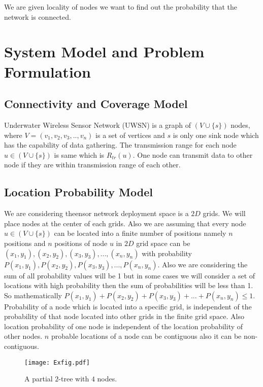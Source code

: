 \documentclass[12pt]{article}
\begin{document}
 We are given locality of nodes we want to find out the probability that the network is connected. 

\section{System Model and Problem Formulation}
\label{sec:systemmodel}
\subsection{Connectivity and Coverage Model}
\label{subsec:conAndCoverage}
Underwater Wireless Sensor Network (UWSN) is a graph of \((V\cup\{s\})\) nodes, where \(V=(v_1,v_2,v_3,..,v_n)\) is a set of vertices and \(s\) is only one sink node which has the capability of data gathering. The transmission range for each node \(u\in (V\cup\{s\})\)  is same which is \(R_{tr}(u)\). One node can transmit data to other node if they are within transmission range of each other.

\subsection{Location Probability Model}
\label{subsec:LPM}
We are considering theensor network deployment space is a \(2D\) grids. We will place nodes at the center of each grids. Also we are assuming that every node \(u\in (V\cup\{s\})\) can be located into a finite number of positions namely \(n\) positions and \(n\) positions of node \(u\) in \(2D\) grid space can be \((x_1,y_1),(x_2,y_2),(x_3,y_3),...,(x_n,y_n)\)  with probability \(P(x_1,y_1),P(x_2,y_2),P(x_3,y_3),...,P(x_n,y_n)\). Also we are considering the sum of all probability values will be 1 but in some cases we will consider a set of locations with high probability then the sum of probabilities will be less than 1. So mathematically  \(P(x_1,y_1)+P(x_2,y_2)+P(x_3,y_3)+...+P(x_n,y_n)\leq 1\). Probability of a node which is located into a specific grid, is independent of the probability of that node located into other grids in the finite grid space. Also location probability of one node is independent of the location probability of other nodes. \(n\) probable locations of a node can be contiguous also it can be non-contiguous.
\begin{figure}
\texttt{[image: Exfig.pdf]}
 \caption{A partial \(2\)-tree with \(4\) nodes.
}
\end{figure}
\end{document}

